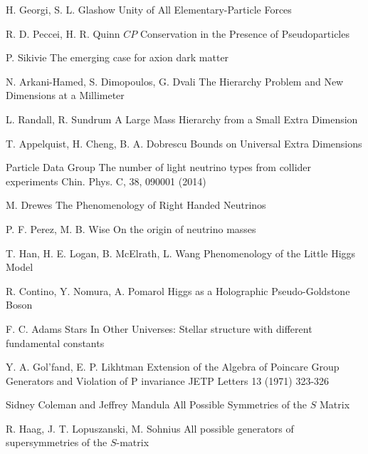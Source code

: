\begin{thebibliography}{2}
{H. Georgi, S. L. Glashow}
{Unity of All Elementary-Particle Forces}
{}

{R. D. Peccei, H. R. Quinn}
{$CP$ Conservation in the Presence of Pseudoparticles}
{}

{P. Sikivie}
{The emerging case for axion dark matter}
{}

{N. Arkani-Hamed, S. Dimopoulos, G. Dvali}
{The Hierarchy Problem and New Dimensions at a Millimeter}
{}

{L. Randall, R. Sundrum}
{A Large Mass Hierarchy from a Small Extra Dimension}
{}

{T. Appelquist, H. Cheng, B. A. Dobrescu}
{Bounds on Universal Extra Dimensions}
{}

{Particle Data Group}
{The number of light neutrino types from collider experiments}
{Chin. Phys. C, 38, 090001 (2014)}

{M. Drewes}
{The Phenomenology of Right Handed Neutrinos}
{}

{P. F. Perez, M. B. Wise}
{On the origin of neutrino masses}
{}

{T. Han, H. E. Logan, B. McElrath, L. Wang}
{Phenomenology of the Little Higgs Model}
{}

{R. Contino, Y. Nomura, A. Pomarol}
{Higgs as a Holographic Pseudo-Goldstone Boson}
{}

{F. C. Adams}
{Stars In Other Universes: Stellar structure with
different fundamental constants}
{}

{Y. A. Gol'fand, E. P. Likhtman}
{Extension of the Algebra of Poincare Group Generators and Violation of P invariance}
{JETP Letters 13 (1971) 323-326}

{Sidney Coleman and Jeffrey Mandula}
{All Possible Symmetries of the $S$ Matrix}
{}

{R. Haag, J. T. Lopuszanski, M. Sohnius}
{All possible generators of supersymmetries of the $S$-matrix}
{}


\end{thebibliography}
